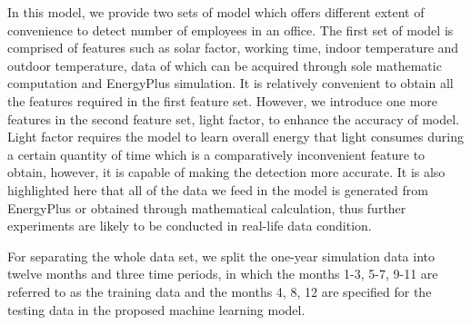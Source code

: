 In this model, we provide two sets of model which offers different
extent of convenience to detect number of employees in an office. The
first set of model is comprised of features such as solar factor,
working time, indoor temperature and outdoor temperature, data of
which can be acquired through sole mathematic computation and
EnergyPlus simulation. It is relatively convenient to obtain all the
features required in the first feature set. However, we introduce one
more features in the second feature set, light factor, to enhance the
accuracy of model. Light factor requires the model to learn overall
energy that light consumes during a certain quantity of time which is
a comparatively inconvenient feature to obtain, however, it is capable
of making the detection more accurate. It is also highlighted here
that all of the data we feed in the model is generated from EnergyPlus
or obtained through mathematical calculation, thus further experiments
are likely to be conducted in real-life data condition.

For separating the whole data set, we split the one-year simulation
data into twelve months and three time periods, in which the months
1-3, 5-7, 9-11 are referred to as the training data and the months 4,
8, 12 are specified for the testing data in the proposed machine
learning model.
